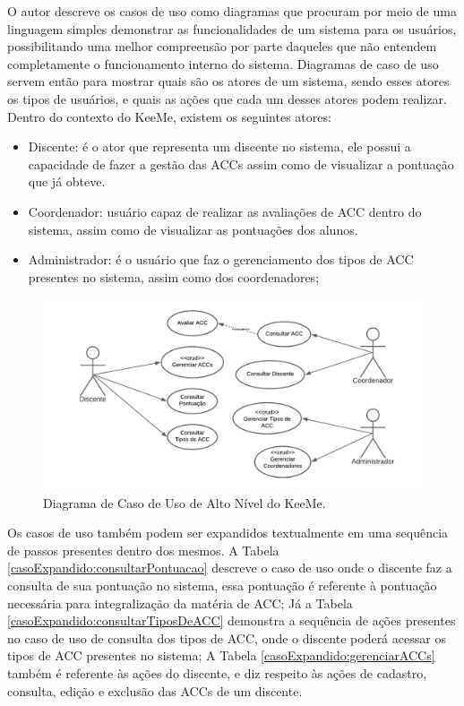 O autor \cite{guedes2018uml} descreve os casos de uso como diagramas que procuram por meio de uma linguagem simples demonstrar as funcionalidades de um sistema para os usuários, possibilitando uma melhor compreensão por parte daqueles que não entendem completamente o funcionamento interno do sistema. Diagramas de caso de uso servem então para mostrar quais são os atores de um sistema, sendo esses atores os tipos de usuários, e quais as ações que cada um desses atores podem realizar. Dentro do contexto do KeeMe, existem os seguintes atores:
\begin{itemize}
    \item Discente: é o ator que representa um discente no sistema, ele possui a capacidade de fazer a gestão das ACCs assim como de visualizar a pontuação que já obteve.
    \item Coordenador: usuário capaz de realizar as avaliações de ACC dentro do sistema, assim como de visualizar as pontuações dos alunos.
    \item Administrador: é o usuário que faz o gerenciamento dos tipos de ACC presentes no sistema, assim como dos coordenadores;
\end{itemize}

\begin{figure}[H]
    \centering
    \includegraphics[width=\textwidth]{dados/figuras/Proposta/casos_de_uso_de_alto_nivel__keeme.pdf}
    \caption{Diagrama de Caso de Uso de Alto Nível do KeeMe.}
    \label{fig:casoDeUsoAltoNivel}
\end{figure}

Os casos de uso também podem ser expandidos textualmente em uma sequência de passos presentes dentro dos mesmos. A Tabela \ref{casoExpandido:consultarPontuacao} descreve o caso de uso onde o discente faz a consulta de sua pontuação no sistema, essa pontuação é referente à pontuação necessária para integralização da matéria de ACC; Já a Tabela \ref{casoExpandido:consultarTiposDeACC} demonstra a sequência de ações presentes no caso de uso de consulta dos tipos de ACC, onde o discente poderá acessar os tipos de ACC presentes no sistema; A Tabela \ref{casoExpandido:gerenciarACCs} também é referente às ações do discente, e diz respeito às ações de cadastro, consulta, edição e exclusão das ACCs de um discente.

